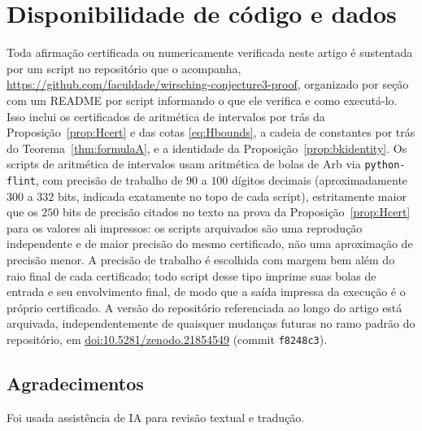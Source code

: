 \documentclass[11pt]{amsart}
\theoremstyle{plain}
\theoremstyle{definition}
\theoremstyle{remark}
\begin{document}
\section{Disponibilidade de código e dados}
\label{sec:code}

Toda afirmação certificada ou numericamente verificada neste artigo é sustentada por um script no
repositório que o acompanha, \url{https://github.com/faculdade/wirsching-conjecture3-proof},
organizado por seção com um README por script informando o que ele verifica e como executá-lo.
Isso inclui os certificados de aritmética de intervalos por trás da Proposição~\ref{prop:Hcert} e
das cotas \eqref{eq:Hbounds}, a cadeia de constantes por trás do Teorema~\ref{thm:formulaA}, e a
identidade da Proposição~\ref{prop:bkidentity}. Os scripts de aritmética de intervalos usam
aritmética de bolas de Arb via \texttt{python-flint}, com precisão de trabalho de $90$ a $100$
dígitos decimais (aproximadamente $300$ a $332$ bits, indicada exatamente no topo de cada script),
estritamente maior que os $250$ bits de precisão citados no texto na prova da
Proposição~\ref{prop:Hcert} para os valores ali impressos: os scripts arquivados são uma
reprodução independente e de maior precisão do mesmo certificado, não uma aproximação de precisão
menor. A precisão de trabalho é escolhida com margem bem além do raio final de cada certificado;
todo script desse tipo imprime suas bolas de entrada e seu envolvimento final, de modo que a saída
impressa da execução é o próprio certificado. A versão do repositório referenciada ao longo do
artigo está arquivada, independentemente de quaisquer mudanças futuras no ramo padrão do
repositório, em \href{https://doi.org/10.5281/zenodo.21854549}{doi:10.5281/zenodo.21854549}
(commit \texttt{f8248c3}).

\subsection*{Agradecimentos}
Foi usada assistência de IA para revisão textual e tradução.
\end{document}
